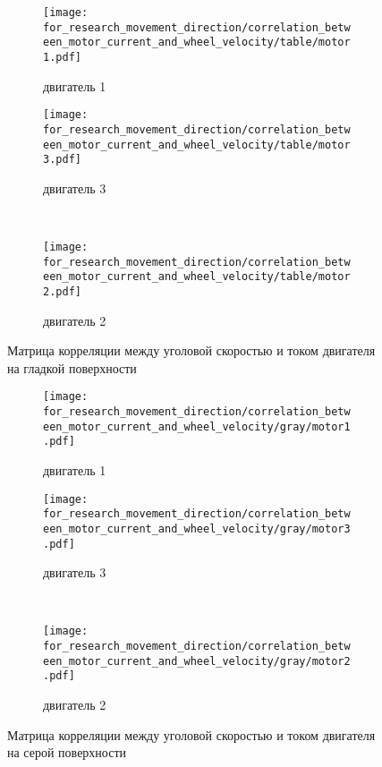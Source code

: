 \begin{figure}[H]
    \centering
    \begin{subfigure}{0.49\textwidth}
        \centering
        \texttt{[image: for\_research\_movement\_direction/correlation\_between\_motor\_current\_and\_wheel\_velocity/table/motor1.pdf]}
        \caption{двигатель 1}
    \end{subfigure}
    \hspace{0.005\textwidth}
    \begin{subfigure}{0.49\textwidth}
        \centering
        \texttt{[image: for\_research\_movement\_direction/correlation\_between\_motor\_current\_and\_wheel\_velocity/table/motor3.pdf]}
        \caption{двигатель 3}
    \end{subfigure} \\
    \vspace{4pt}
    \centering
    \begin{subfigure}{0.49\textwidth}
        \centering
        \texttt{[image: for\_research\_movement\_direction/correlation\_between\_motor\_current\_and\_wheel\_velocity/table/motor2.pdf]}
        \caption{двигатель 2}
    \end{subfigure}
    \caption{Матрица корреляции между уголовой скоростью и током двигателя на гладкой поверхности}
\end{figure}

\begin{figure}[H]
    \centering
    \begin{subfigure}{0.49\textwidth}
        \centering
        \texttt{[image: for\_research\_movement\_direction/correlation\_between\_motor\_current\_and\_wheel\_velocity/gray/motor1.pdf]}
        \caption{двигатель 1}
    \end{subfigure}
    \hspace{0.005\textwidth}
    \begin{subfigure}{0.49\textwidth}
        \centering
        \texttt{[image: for\_research\_movement\_direction/correlation\_between\_motor\_current\_and\_wheel\_velocity/gray/motor3.pdf]}
        \caption{двигатель 3}
    \end{subfigure} \\
    \vspace{4pt}
    \centering
    \begin{subfigure}{0.49\textwidth}
        \centering
        \texttt{[image: for\_research\_movement\_direction/correlation\_between\_motor\_current\_and\_wheel\_velocity/gray/motor2.pdf]}
        \caption{двигатель 2}
    \end{subfigure}
    \caption{Матрица корреляции между уголовой скоростью и током двигателя на серой поверхности}
\end{figure}

